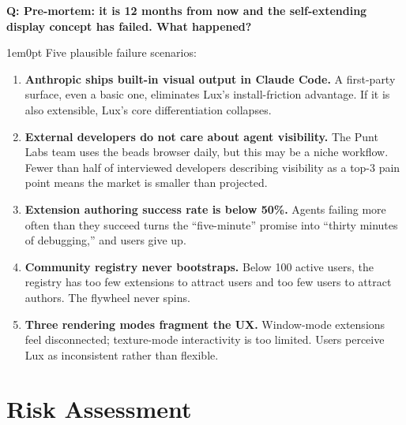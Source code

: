 \documentclass[11pt,letterpaper]{article}
\newcounter{faqnum}
\newenvironment{faqpair}[1]{%
  \needspace{4\baselineskip}%
  \vspace{0.5em}%
  \refstepcounter{faqnum}%
  \noindent\textbf{\color{SectionBlue}Q\thefaqnum: #1}\par\nopagebreak[4]%
  \vspace{0.2em}%
  \begin{adjustwidth}{1em}{0pt}%
  \setlength{\parindent}{0pt}%
}{%
  \end{adjustwidth}%
  \vspace{0.5em}%
}
\begin{document}
\begin{faqpair}{Pre-mortem: it is 12 months from now and the self-extending
  display concept has failed.  What happened?}\label{faq:premortem}
  Five plausible failure scenarios:

  \begin{enumerate}[nosep]
    \item \textbf{Anthropic ships built-in visual output in Claude Code.}
      A first-party surface, even a basic one, eliminates Lux's
      install-friction advantage.  If it is also extensible, Lux's
      core differentiation collapses.
    \item \textbf{External developers do not care about agent visibility.}
      The Punt Labs team uses the beads browser daily, but this may be a
      niche workflow.  Fewer than half of interviewed developers describing
      visibility as a top-3 pain point means the market is smaller than
      projected.
    \item \textbf{Extension authoring success rate is below 50\%.}
      Agents failing more often than they succeed turns the ``five-minute''
      promise into ``thirty minutes of debugging,'' and users give up.
    \item \textbf{Community registry never bootstraps.}  Below 100 active
      users, the registry has too few extensions to attract users and too
      few users to attract authors.  The flywheel never spins.
    \item \textbf{Three rendering modes fragment the UX.}  Window-mode
      extensions feel disconnected; texture-mode interactivity is too
      limited.  Users perceive Lux as inconsistent rather than flexible.
  \end{enumerate}
\end{faqpair}


\newpage
\section*{Risk Assessment}
\end{document}
